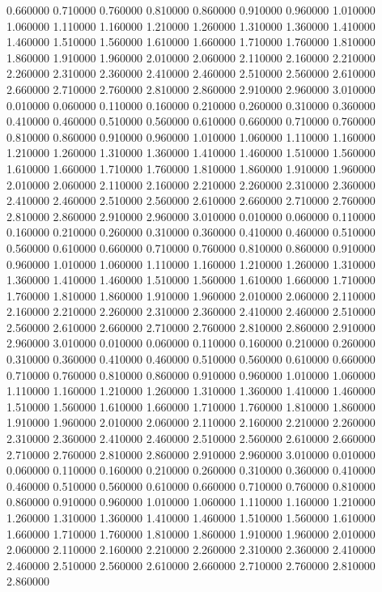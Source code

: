 0.660000
0.710000
0.760000
0.810000
0.860000
0.910000
0.960000
1.010000
1.060000
1.110000
1.160000
1.210000
1.260000
1.310000
1.360000
1.410000
1.460000
1.510000
1.560000
1.610000
1.660000
1.710000
1.760000
1.810000
1.860000
1.910000
1.960000
2.010000
2.060000
2.110000
2.160000
2.210000
2.260000
2.310000
2.360000
2.410000
2.460000
2.510000
2.560000
2.610000
2.660000
2.710000
2.760000
2.810000
2.860000
2.910000
2.960000
3.010000
0.010000
0.060000
0.110000
0.160000
0.210000
0.260000
0.310000
0.360000
0.410000
0.460000
0.510000
0.560000
0.610000
0.660000
0.710000
0.760000
0.810000
0.860000
0.910000
0.960000
1.010000
1.060000
1.110000
1.160000
1.210000
1.260000
1.310000
1.360000
1.410000
1.460000
1.510000
1.560000
1.610000
1.660000
1.710000
1.760000
1.810000
1.860000
1.910000
1.960000
2.010000
2.060000
2.110000
2.160000
2.210000
2.260000
2.310000
2.360000
2.410000
2.460000
2.510000
2.560000
2.610000
2.660000
2.710000
2.760000
2.810000
2.860000
2.910000
2.960000
3.010000
0.010000
0.060000
0.110000
0.160000
0.210000
0.260000
0.310000
0.360000
0.410000
0.460000
0.510000
0.560000
0.610000
0.660000
0.710000
0.760000
0.810000
0.860000
0.910000
0.960000
1.010000
1.060000
1.110000
1.160000
1.210000
1.260000
1.310000
1.360000
1.410000
1.460000
1.510000
1.560000
1.610000
1.660000
1.710000
1.760000
1.810000
1.860000
1.910000
1.960000
2.010000
2.060000
2.110000
2.160000
2.210000
2.260000
2.310000
2.360000
2.410000
2.460000
2.510000
2.560000
2.610000
2.660000
2.710000
2.760000
2.810000
2.860000
2.910000
2.960000
3.010000
0.010000
0.060000
0.110000
0.160000
0.210000
0.260000
0.310000
0.360000
0.410000
0.460000
0.510000
0.560000
0.610000
0.660000
0.710000
0.760000
0.810000
0.860000
0.910000
0.960000
1.010000
1.060000
1.110000
1.160000
1.210000
1.260000
1.310000
1.360000
1.410000
1.460000
1.510000
1.560000
1.610000
1.660000
1.710000
1.760000
1.810000
1.860000
1.910000
1.960000
2.010000
2.060000
2.110000
2.160000
2.210000
2.260000
2.310000
2.360000
2.410000
2.460000
2.510000
2.560000
2.610000
2.660000
2.710000
2.760000
2.810000
2.860000
2.910000
2.960000
3.010000
0.010000
0.060000
0.110000
0.160000
0.210000
0.260000
0.310000
0.360000
0.410000
0.460000
0.510000
0.560000
0.610000
0.660000
0.710000
0.760000
0.810000
0.860000
0.910000
0.960000
1.010000
1.060000
1.110000
1.160000
1.210000
1.260000
1.310000
1.360000
1.410000
1.460000
1.510000
1.560000
1.610000
1.660000
1.710000
1.760000
1.810000
1.860000
1.910000
1.960000
2.010000
2.060000
2.110000
2.160000
2.210000
2.260000
2.310000
2.360000
2.410000
2.460000
2.510000
2.560000
2.610000
2.660000
2.710000
2.760000
2.810000
2.860000
